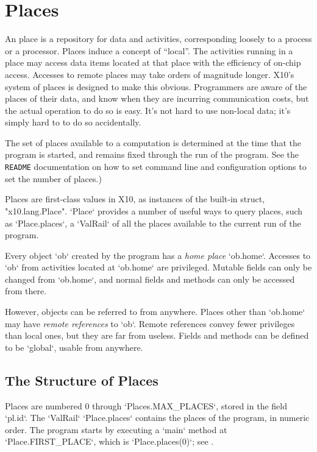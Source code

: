 \chapter{Places}\label{XtenPlaces}

An \Xten{} place is a repository for data and activities, corresponding
loosely to a process or a processor. Places induce a concept of ``local''. The
activities running in a place may access data items located at that place with
the efficiency of on-chip access. Accesses to remote places may take orders of
magnitude longer. X10's system of places is designed to make this obvious.
Programmers are aware of the places of their data, and know when they are
incurring communication costs, but the actual operation to do so is easy. It's
not hard to use non-local data; it's simply hard to to do so accidentally.

The set of places available to a computation is determined at the time that
the program is started, and remains fixed through the run of the program. See
the {\tt README} documentation on how to set command line and configuration
options to set the number of places.)

Places are first-class values in X10, as instances of the built-in struct,
\xcd"x10.lang.Place".   \xcd`Place` provides a number of useful ways to
query places, such as \xcd`Place.places`, a \xcd`ValRail` of all the places
available to the current run of the program.


Every object \xcd`ob` created by the program has a {\em home place}
\xcd`ob.home`. Accesses to \xcd`ob` from activities located at \xcd`ob.home`
are privileged.  Mutable fields can only be changed from \xcd`ob.home`, and
normal fields and methods can only be accessed from there. 

However, objects can be referred to from anywhere.  Places other than
\xcd`ob.home` may have {\em remote references} to \xcd`ob`.  Remote references
convey fewer privileges than local ones, but they are far from useless.
Fields and methods can be defined to be \xcd`global`, usable from anywhere. 


\section{The Structure of Places}

Places are numbered 0 through \xcd`Places.MAX_PLACES`, stored in the field
\xcd`pl.id`.  The \xcd`ValRail` \xcd`Place.places` contains the places of the
program, in numeric order. 
The program starts by executing a \xcd`main` method at
\xcd`Place.FIRST_PLACE`, which is \xcd`Place.places(0)`; see
. 

